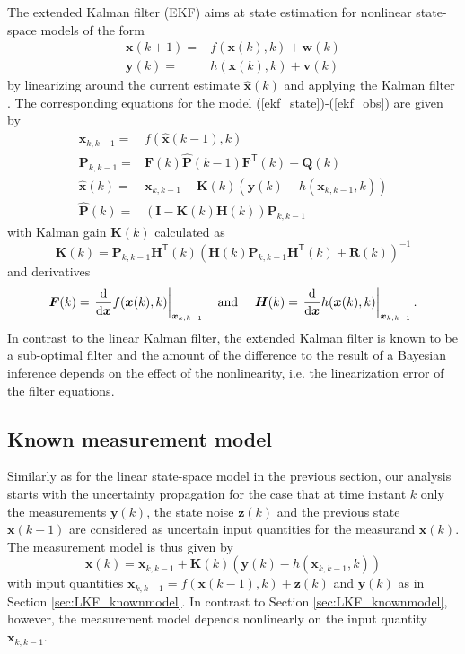 \documentclass[10pt]{article}
\begin{document}
\begin{spacing}{1}
The extended Kalman filter (EKF) aims at state estimation for nonlinear state-space models of the form
\begin{align}
	\bm{x}(k+1) =& f(\bm{x}(k),k) + \bm{w}(k) \label{ekf_state}\\
	\bm{y}(k) =& h(\bm{x}(k),k) + \bm{v}(k) \label{ekf_obs}
\end{align}
by linearizing around the current estimate $\hat{\bm{x}}(k)$ and applying the Kalman filter \cite{Julier:2004go}. The corresponding equations for the model (\ref{ekf_state})-(\ref{ekf_obs}) are given by
\begin{align}
	\bm{x}_{k,k-1} =& f(\hat{\bm{x}}(k-1),k) \label{EKF:pred_state}\\
	\bm{P}_{k,k-1} =& \bm{F}(k)\hat{\bm{P}}(k-1)\bm{F}^{\mathsf{T}}(k)+\bm{Q}(k) \label{EKF:pred_cov}\\
	\hat{\bm{x}}(k) =& \bm{x}_{k,k-1} + \bm{K}(k)\left( \bm{y}(k)-h(\bm{x}_{k,k-1},k) \right) \label{EKF:est_state} \\
	\hat{\bm{P}}(k) =& \left( \bm{I}-\bm{K}(k)\bm{H}(k) \right)\bm{P}_{k,k-1} \label{EKF:est_cov}
\end{align}
with Kalman gain $\bm{K}(k)$ calculated as
\[ \bm{K}(k) = \bm{P}_{k,k-1}\bm{H}^{\mathsf{T}}(k)\left( \bm{H}(k)\bm{P}_{k,k-1}\bm{H}^{\mathsf{T}}(k)+\bm{R}(k) \right)^{-1} \]
and derivatives
\[ \bm{F}(k)=\left.\frac{\mathrm{d}}{\mathrm{d}\bm{x}}f(\bm{x}(k),k)\right|_{\bm{x}_{k,k-1}} \textnormal{\quad and \quad} 
   \bm{H}(k)=\left.\frac{\mathrm{d}}{\mathrm{d}\bm{x}}h(\bm{x}(k),k)\right|_{\bm{x}_{k,k-1}} .\]
In contrast to the linear Kalman filter, the extended Kalman filter is known to be a sub-optimal filter \cite{Arulampalam:2002hg} and the amount of the difference to the result of a Bayesian inference depends on the effect of the nonlinearity, i.e. the linearization error of the filter equations.

\subsection{Known measurement model}
Similarly as for the linear state-space model in the previous section, our analysis starts with the uncertainty propagation for the case that at time instant $k$ only the measurements $\bm{y}(k)$, the state noise $\bm{z}(k)$ and the previous state $\bm{x}(k-1)$ are considered as uncertain input quantities for the measurand $\bm{x}(k)$. The measurement model is thus given by
\begin{equation}
	\bm{x}(k) = \bm{x}_{k,k-1} + \bm{K}(k)\left( \bm{y}(k)-h(\bm{x}_{k,k-1},k) \right)  \label{ekf_measurand}
\end{equation}
with input quantities $\bm{x}_{k,k-1}=f(\bm{x}(k-1),k) + \bm{z}(k)$ and $\bm{y}(k)$ as in Section \ref{sec:LKF_knownmodel}. 
In contrast to Section \ref{sec:LKF_knownmodel}, however, the measurement model depends nonlinearly on the input quantity $\bm{x}_{k,k-1}$. 


\end{spacing}
\end{document}
